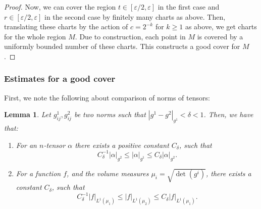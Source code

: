 \documentclass[10pt, a4paper]{article}
\theoremstyle{plain}%
\newtheorem{lem}[theorem]{Lemma}
\theoremstyle{definition}
\numberwithin{figure}{section}
\numberwithin{equation}{section}
\newcommand{\ep}{\varepsilon}
\begin{document}
\begin{proof}
	Now, we can cover the region $t\in [\ep/2,\ep]$ in the first case and $r\in[\ep/2,\ep]$ in the second case by finitely many charts as above. Then, translating these charts by the action of $c=2^{-k}$ for $k\geq 1$ as above, we get charts for the whole region $M$. Due to construction, each point in $M$ is covered by a uniformly bounded number of these charts. This constructs a good cover for $M$. 
\end{proof}

\subsubsection{Estimates for a good cover}

First, we note the following about comparison of norms of tensors:

\begin{lem}
	Let $g^1_{ij},g^2_{ij}$ be two norms such that $|g^1-g^2|_{g^1} < \delta<1$. Then, we have that:
	
	\begin{enumerate}
		\item For an $n$-tensor $\alpha$ there exists a positive constant $C_\delta$, such that  \[
		C_\delta^{-1}|\alpha|_{g^2}\leq |\alpha|_{g^1}\leq C_\delta|\alpha|_{g^2}.
		\]
		\item For a function $f$, and the volume measures $\mu_i = \sqrt{\det(g^i)}$, there exists a constant $C_\delta$, such that \[
		C_\delta^{-1}|f|_{L^1(\mu_1)} \leq |f|_{L^1(\mu_2)} \leq C_\delta|f|_{L^1(\mu_1)}.
		\]
	\end{enumerate} 
\end{lem}
\end{document}
